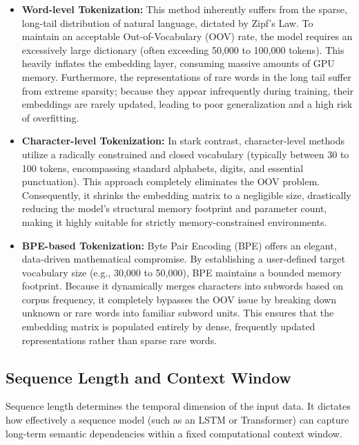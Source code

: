 \begin{itemize}
    \item \textbf{Word-level Tokenization:} This method inherently suffers from the sparse, long-tail distribution of natural language, dictated by Zipf's Law. To maintain an acceptable Out-of-Vocabulary (OOV) rate, the model requires an excessively large dictionary (often exceeding 50,000 to 100,000 tokens). This heavily inflates the embedding layer, consuming massive amounts of GPU memory. Furthermore, the representations of rare words in the long tail suffer from extreme sparsity; because they appear infrequently during training, their embeddings are rarely updated, leading to poor generalization and a high risk of overfitting.
    \item \textbf{Character-level Tokenization:} In stark contrast, character-level methods utilize a radically constrained and closed vocabulary (typically between 30 to 100 tokens, encompassing standard alphabets, digits, and essential punctuation). This approach completely eliminates the OOV problem. Consequently, it shrinks the embedding matrix to a negligible size, drastically reducing the model's structural memory footprint and parameter count, making it highly suitable for strictly memory-constrained environments.
    \item \textbf{BPE-based Tokenization:} Byte Pair Encoding (BPE) offers an elegant, data-driven mathematical compromise. By establishing a user-defined target vocabulary size (e.g., 30,000 to 50,000), BPE maintains a bounded memory footprint. Because it dynamically merges characters into subwords based on corpus frequency, it completely bypasses the OOV issue by breaking down unknown or rare words into familiar subword units. This ensures that the embedding matrix is populated entirely by dense, frequently updated representations rather than sparse rare words.
\end{itemize}

\subsection{Sequence Length and Context Window}
Sequence length determines the temporal dimension of the input data. It dictates how effectively a sequence model (such as an LSTM or Transformer) can capture long-term semantic dependencies within a fixed computational context window.

